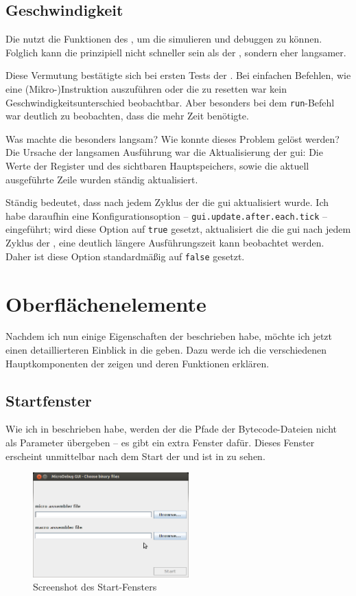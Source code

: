 \subsection{Geschwindigkeit}
Die \mdg nutzt die Funktionen des \md, um die \mic simulieren und debuggen zu können. Folglich kann die \mdg prinzipiell nicht schneller sein als der \md, sondern eher langsamer.

Diese Vermutung bestätigte sich bei ersten Tests der \mdg. Bei einfachen Befehlen, wie eine (Mikro-)Instruktion auszuführen oder die \mic zu resetten war kein Geschwindigkeitsunterschied beobachtbar. Aber besonders bei dem \texttt{run}-Befehl war deutlich zu beobachten, dass die \mdg mehr Zeit benötigte.

Was machte die \mdg besonders langsam? Wie konnte dieses Problem gelöst werden? Die Ursache der langsamen Ausführung war die Aktualisierung der \gls{gui}: Die Werte der Register und des sichtbaren Hauptspeichers, sowie die aktuell ausgeführte Zeile wurden ständig aktualisiert.

Ständig bedeutet, dass nach jedem Zyklus der \mic die \gls{gui} aktualisiert wurde. Ich habe daraufhin eine Konfigurationsoption -- \texttt{gui.update.after.each.tick} -- eingeführt; wird diese Option auf \texttt{true} gesetzt, aktualisiert die \mdg die \gls{gui} nach jedem Zyklus der \mic, eine deutlich längere Ausführungszeit kann beobachtet werden. Daher ist diese Option standardmäßig auf \texttt{false} gesetzt.

\section{Oberflächenelemente}
Nachdem ich nun einige Eigenschaften der \mdg beschrieben habe, möchte ich jetzt einen detaillierteren Einblick in die \mdg geben. Dazu werde ich die verschiedenen Hauptkomponenten der \mdg zeigen und deren Funktionen erklären.

\subsection{Startfenster}
Wie ich in  beschrieben habe, werden der \mdg die Pfade der Bytecode-Dateien nicht als Parameter übergeben -- es gibt ein extra Fenster dafür. Dieses Fenster erscheint unmittelbar nach dem Start der \mdg und ist in  zu sehen.

\begin{figure}[h]
	\centering
	\includegraphics[width=6cm]{images/start-frame-empty}
	\caption{Screenshot des Start-Fensters}
\end{figure}

